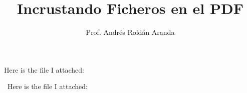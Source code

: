 \documentclass{article}
\begin{document}
  \title{Incrustando Ficheros en el PDF}
  \author{Prof. Andrés Roldán Aranda}
  \maketitle

  Here is the file I attached:   


\
  Here is the file I attached: 
	
 \
\end{document}
